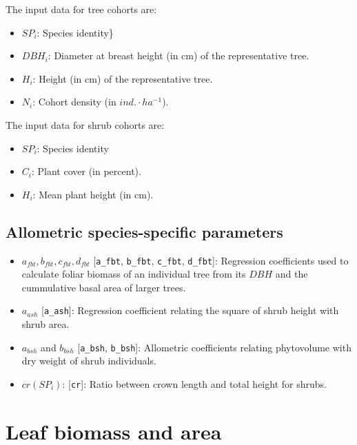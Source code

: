 \documentclass[]{book}
\providecommand{\tightlist}{%
  \setlength{\itemsep}{0pt}\setlength{\parskip}{0pt}}
\begin{document}
The input data for tree cohorts are:

\begin{itemize}
\tightlist
\item
  \(SP_i\): Species identity\}
\item
  \(DBH_i\): Diameter at breast height (in cm) of the representative
  tree.
\item
  \(H_i\): Height (in cm) of the representative tree.
\item
  \(N_i\): Cohort density (in \(ind.\cdot ha^{-1}\)).
\end{itemize}

The input data for shrub cohorts are:

\begin{itemize}
\tightlist
\item
  \(SP_i\): Species identity
\item
  \(C_i\): Plant cover (in percent).
\item
  \(H_i\): Mean plant height (in cm).
\end{itemize}

\subsection{Allometric species-specific
parameters}\label{allometric-species-specific-parameters}

\begin{itemize}
\tightlist
\item
  \(a_{fbt}, b_{fbt}, c_{fbt}, d_{fbt}\) {[}\texttt{a\_fbt},
  \texttt{b\_fbt}, \texttt{c\_fbt}, \texttt{d\_fbt}{]}: Regression
  coefficients used to calculate foliar biomass of an individual tree
  from its \(DBH\) and the cummulative basal area of larger trees.
\item
  \(a_{ash}\) {[}\texttt{a\_ash}{]}: Regression coefficient relating the
  square of shrub height with shrub area.
\item
  \(a_{bsh}\) and \(b_{bsh}\) {[}\texttt{a\_bsh}, \texttt{b\_bsh}{]}:
  Allometric coefficients relating phytovolume with dry weight of shrub
  individuals.
\item
  \(cr(SP_i)\): {[}\texttt{cr}{]}: Ratio between crown length and total
  height for shrubs.
\end{itemize}

\section{Leaf biomass and area}\label{leaf-biomass-and-area}
\end{document}
